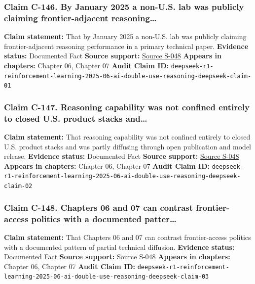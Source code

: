 \documentclass[
  american,
  11pt,
  letterpaper,
]{article}
\begin{document}
\subsubsection{Claim C-146. By January 2025 a non-U.S. lab was publicly
claiming frontier-adjacent
reasoning\ldots{}}\label{claim-c-146-by-january-2025-a-non-u-s-lab-was-publicly-claiming-frontier-adjacent-reasoning}

\textbf{Claim statement:} That by January 2025 a non-U.S. lab was
publicly claiming frontier-adjacent reasoning performance in a primary
technical paper. \textbf{Evidence status:} Documented Fact
\textbf{Source support:}
\hyperref[source-s-048-deepseek-r1-incentivizing-reasoning-capability-in-llms-via-reinforcement-learning]{Source
S-048} \textbf{Appears in chapters:} Chapter 06, Chapter 07
\textbf{Audit Claim ID:}
\texttt{deepseek-r1-reinforcement-learning-2025-06-ai-double-use-reasoning-deepseek-claim-01}

\subsubsection{Claim C-147. Reasoning capability was not confined
entirely to closed U.S. product stacks
and\ldots{}}\label{claim-c-147-reasoning-capability-was-not-confined-entirely-to-closed-u-s-product-stacks-and}

\textbf{Claim statement:} That reasoning capability was not confined
entirely to closed U.S. product stacks and was partly diffusing through
open publication and model release. \textbf{Evidence status:} Documented
Fact \textbf{Source support:}
\hyperref[source-s-048-deepseek-r1-incentivizing-reasoning-capability-in-llms-via-reinforcement-learning]{Source
S-048} \textbf{Appears in chapters:} Chapter 06, Chapter 07
\textbf{Audit Claim ID:}
\texttt{deepseek-r1-reinforcement-learning-2025-06-ai-double-use-reasoning-deepseek-claim-02}

\subsubsection{Claim C-148. Chapters 06 and 07 can contrast
frontier-access politics with a documented
patter\ldots{}}\label{claim-c-148-chapters-06-and-07-can-contrast-frontier-access-politics-with-a-documented-patter}

\textbf{Claim statement:} That Chapters 06 and 07 can contrast
frontier-access politics with a documented pattern of partial technical
diffusion. \textbf{Evidence status:} Documented Fact \textbf{Source
support:}
\hyperref[source-s-048-deepseek-r1-incentivizing-reasoning-capability-in-llms-via-reinforcement-learning]{Source
S-048} \textbf{Appears in chapters:} Chapter 06, Chapter 07
\textbf{Audit Claim ID:}
\texttt{deepseek-r1-reinforcement-learning-2025-06-ai-double-use-reasoning-deepseek-claim-03}
\end{document}
